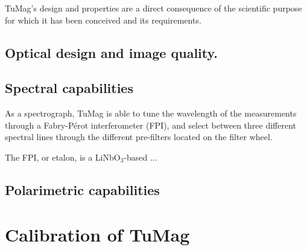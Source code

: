 TuMag's design and properties are a direct consequence of the scientific purpose for which it has been conceived and its requirements. 

\subsection{Optical design and image quality.}



\subsection{Spectral capabilities}

As a spectrograph, TuMag is able to tune the wavelength of the measurements through a Fabry-Pérot interferometer (FPI), and select between three different spectral lines through the different pre-filters located on the filter wheel. 

The FPI, or etalon, is a LiNbO$_3$-based ...



\subsection{Polarimetric capabilities}



\section{Calibration of TuMag}
